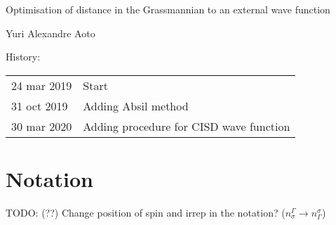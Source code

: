 \documentclass[a4paper,11pt]{article}
\newcommand{\irp}{\ensuremath{\Gamma}}
\begin{document}
\begin{center}
  {\LARGE Optimisation of distance in the Grassmannian to an external wave function}\vspace{1.0cm}

  {\Large Yuri Alexandre Aoto}
\end{center}
{History:
  
  \begin{tabular}{l@{ - }l}
    24 mar 2019 & Start\\
    31 oct 2019 & Adding Absil method\\
    30 mar 2020 & Adding procedure for CISD wave function\\
  \end{tabular}
}\vspace{3cm}


\section{Notation}

TODO: (??) Change position of spin and irrep in the notation? ($n_\sigma^\irp \to n_\irp^\sigma$)
\end{document}
